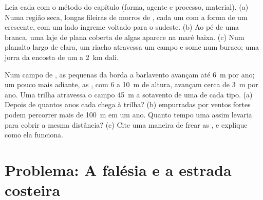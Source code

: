 \begin{exercise}[$\star\star\star$]\label{exo:g9:landforms:11}
Leia cada  com o método do capítulo (forma, agente e processo,
material). (a) Numa região seca, longas fileiras de morros de , cada
um com a forma de um crescente, com um lado íngreme voltado para o
sudeste. (b) Ao pé de uma  branca, uma laje de  plana coberta
de algas aparece na maré baixa. (c) Num planalto largo de  clara, um
riacho atravessa um campo e some num buraco; uma  jorra da
encosta de um  a \qty{2}{km} dali.
\end{exercise}

\begin{exercise}[$\star\star\star$]\label{exo:g9:landforms:12}
Num campo de , as pequenas  da borda a barlavento avançam até
\qty{6}{m} por ano; um pouco mais adiante, as , com 6 a \qty{10}{m}
de altura, avançam cerca de \qty{3}{m} por ano. Uma trilha atravessa o
campo \qty{45}{m} a sotavento de uma  de cada tipo. (a) Depois de
quantos anos cada  chega à trilha? (b)  empurradas por ventos
fortes podem percorrer mais de \qty{100}{m} em um ano. Quanto tempo uma
 assim levaria para cobrir a mesma distância? (c) Cite uma maneira de
frear as , e explique como ela funciona.
\end{exercise}

\section{Problema: A falésia e a estrada costeira}

